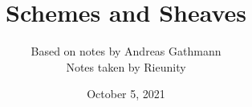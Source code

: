 \documentclass[a4paper,12pt]{article}
\begin{document}
\title{Schemes and Sheaves}
\author{{Based on notes by Andreas Gathmann}\\
\small Notes taken by Rieunity}
\date{October 5, 2021}  
\maketitle


%
%
\end{document}
